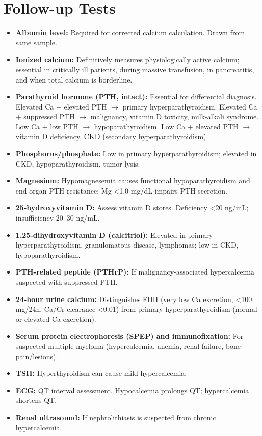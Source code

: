 \section*{Follow-up Tests}
\begin{itemize}
  \item \textbf{Albumin level:} Required for corrected calcium calculation. Drawn from same sample.
  \item \textbf{Ionized calcium:} Definitively measures physiologically active calcium; essential in critically ill patients, during massive transfusion, in pancreatitis, and when total calcium is borderline.
  \item \textbf{Parathyroid hormone (PTH, intact):} Essential for differential diagnosis. Elevated Ca + elevated PTH $\rightarrow$ primary hyperparathyroidism. Elevated Ca + suppressed PTH $\rightarrow$ malignancy, vitamin D toxicity, milk-alkali syndrome. Low Ca + low PTH $\rightarrow$ hypoparathyroidism. Low Ca + elevated PTH $\rightarrow$ vitamin D deficiency, CKD (secondary hyperparathyroidism).
  \item \textbf{Phosphorus/phosphate:} Low in primary hyperparathyroidism; elevated in CKD, hypoparathyroidism, tumor lysis.
  \item \textbf{Magnesium:} Hypomagnesemia causes functional hypoparathyroidism and end-organ PTH resistance; Mg <1.0 mg/dL impairs PTH secretion.
  \item \textbf{25-hydroxyvitamin D:} Assess vitamin D stores. Deficiency <20 ng/mL; insufficiency 20--30 ng/mL.
  \item \textbf{1,25-dihydroxyvitamin D (calcitriol):} Elevated in primary hyperparathyroidism, granulomatous disease, lymphomas; low in CKD, hypoparathyroidism.
  \item \textbf{PTH-related peptide (PTHrP):} If malignancy-associated hypercalcemia suspected with suppressed PTH.
  \item \textbf{24-hour urine calcium:} Distinguishes FHH (very low Ca excretion, <100 mg/24h, Ca/Cr clearance <0.01) from primary hyperparathyroidism (normal or elevated Ca excretion).
  \item \textbf{Serum protein electrophoresis (SPEP) and immunofixation:} For suspected multiple myeloma (hypercalcemia, anemia, renal failure, bone pain/lesions).
  \item \textbf{TSH:} Hyperthyroidism can cause mild hypercalcemia.
  \item \textbf{ECG:} QT interval assessment. Hypocalcemia prolongs QT; hypercalcemia shortens QT.
  \item \textbf{Renal ultrasound:} If nephrolithiasis is suspected from chronic hypercalcemia.
\end{itemize}

